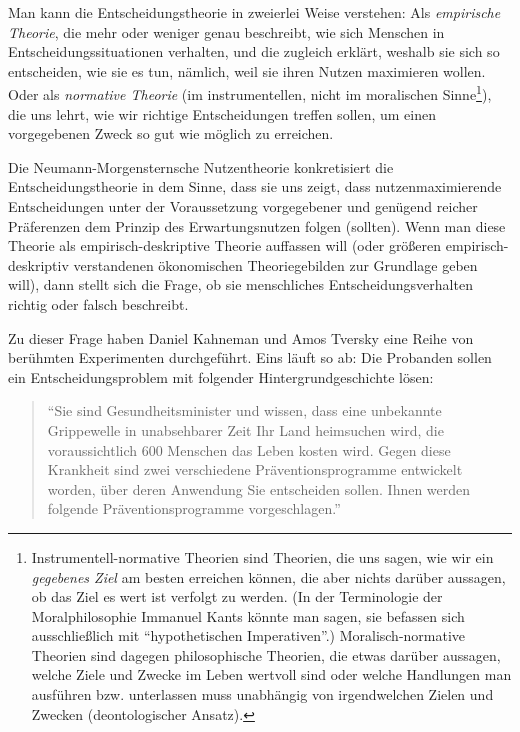 Man kann die Entscheidungstheorie in zweierlei Weise verstehen: Als {\em
empirische Theorie}, die mehr oder weniger genau beschreibt, wie sich Menschen in
Entscheidungssituationen verhalten, und die zugleich erklärt, weshalb sie sich so
entscheiden, wie sie es tun, nämlich, weil sie ihren Nutzen maximieren wollen.
Oder als {\em normative Theorie} (im instrumentellen, nicht im moralischen
Sinne\footnote{Instrumentell-normative Theorien sind Theorien, die uns sagen, wie
wir ein {\em gegebenes Ziel} am besten erreichen können, die aber nichts darüber
aussagen, ob das Ziel es wert ist verfolgt zu werden. (In der Terminologie der
Moralphilosophie Immanuel Kants könnte man sagen, sie befassen sich
ausschließlich mit "`hypothetischen Imperativen"'.) Moralisch-normative Theorien
sind dagegen philosophische Theorien, die etwas darüber aussagen, welche Ziele
und Zwecke im Leben wertvoll sind oder welche Handlungen man ausführen bzw.
unterlassen muss unabhängig von irgendwelchen Zielen und Zwecken
(deontologischer Ansatz).}), die uns lehrt, wie wir richtige Entscheidungen
treffen sollen, um einen vorgegebenen Zweck so gut wie möglich zu erreichen.

Die Neumann-Morgensternsche Nutzentheorie konkretisiert die
Entscheidungstheorie in dem Sinne, dass sie uns zeigt, dass nutzenmaximierende
Entscheidungen unter der Voraussetzung vorgegebener und genügend reicher 
Präferenzen dem Prinzip des Erwartungsnutzen folgen (sollten). Wenn man diese
Theorie als empirisch-deskriptive Theorie auffassen will (oder größeren
empirisch-deskriptiv verstandenen ökonomischen Theoriegebilden zur Grundlage
geben will), dann stellt sich die Frage, ob sie menschliches
Entscheidungsverhalten richtig oder falsch beschreibt. 

Zu dieser Frage haben Daniel Kahneman und Amos Tversky eine Reihe von berühmten
Experimenten durchgeführt. Eins läuft so ab: Die Probanden sollen
ein Entscheidungsproblem mit folgender Hintergrundgeschichte lösen:

\begin{quote}
``Sie sind Gesundheitsminister
und wissen, dass eine unbekannte Grippewelle in unabsehbarer Zeit
Ihr Land heimsuchen wird, die voraussichtlich 600 Menschen das
Leben kosten wird. Gegen diese Krankheit sind zwei verschiedene
Präventionsprogramme entwickelt worden, über deren Anwendung
Sie entscheiden sollen. Ihnen werden folgende Präventionsprogramme
vorgeschlagen.'' \cite[S. 43]{fritz:2002}
\end{quote}

